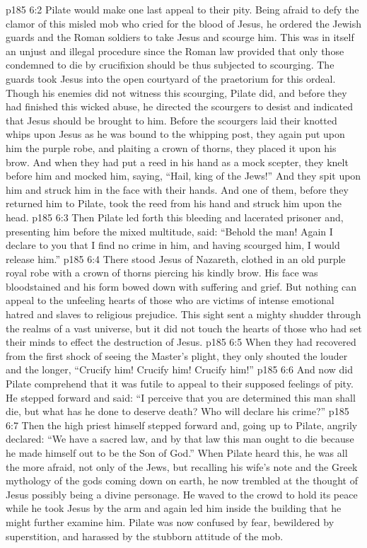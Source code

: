 \vs p185 6:2 Pilate would make one last appeal to their pity. Being afraid to defy the clamor of this misled mob who cried for the blood of Jesus, he ordered the Jewish guards and the Roman soldiers to take Jesus and scourge him. This was in itself an unjust and illegal procedure since the Roman law provided that only those condemned to die by crucifixion should be thus subjected to scourging. The guards took Jesus into the open courtyard of the praetorium for this ordeal. Though his enemies did not witness this scourging, Pilate did, and before they had finished this wicked abuse, he directed the scourgers to desist and indicated that Jesus should be brought to him. Before the scourgers laid their knotted whips upon Jesus as he was bound to the whipping post, they again put upon him the purple robe, and plaiting a crown of thorns, they placed it upon his brow. And when they had put a reed in his hand as a mock scepter, they knelt before him and mocked him, saying, “Hail, king of the Jews!” And they spit upon him and struck him in the face with their hands. And one of them, before they returned him to Pilate, took the reed from his hand and struck him upon the head.
\vs p185 6:3 Then Pilate led forth this bleeding and lacerated prisoner and, presenting him before the mixed multitude, said: “Behold the man! Again I declare to you that I find no crime in him, and having scourged him, I would release him.”
\vs p185 6:4 There stood Jesus of Nazareth, clothed in an old purple royal robe with a crown of thorns piercing his kindly brow. His face was bloodstained and his form bowed down with suffering and grief. But nothing can appeal to the unfeeling hearts of those who are victims of intense emotional hatred and slaves to religious prejudice. This sight sent a mighty shudder through the realms of a vast universe, but it did not touch the hearts of those who had set their minds to effect the destruction of Jesus.
\vs p185 6:5 When they had recovered from the first shock of seeing the Master’s plight, they only shouted the louder and the longer, “Crucify him! Crucify him! Crucify him!”
\vs p185 6:6 And now did Pilate comprehend that it was futile to appeal to their supposed feelings of pity. He stepped forward and said: “I perceive that you are determined this man shall die, but what has he done to deserve death? Who will declare his crime?”
\vs p185 6:7 Then the high priest himself stepped forward and, going up to Pilate, angrily declared: “We have a sacred law, and by that law this man ought to die because he made himself out to be the Son of God.” When Pilate heard this, he was all the more afraid, not only of the Jews, but recalling his wife’s note and the Greek mythology of the gods coming down on earth, he now trembled at the thought of Jesus possibly being a divine personage. He waved to the crowd to hold its peace while he took Jesus by the arm and again led him inside the building that he might further examine him. Pilate was now confused by fear, bewildered by superstition, and harassed by the stubborn attitude of the mob.
